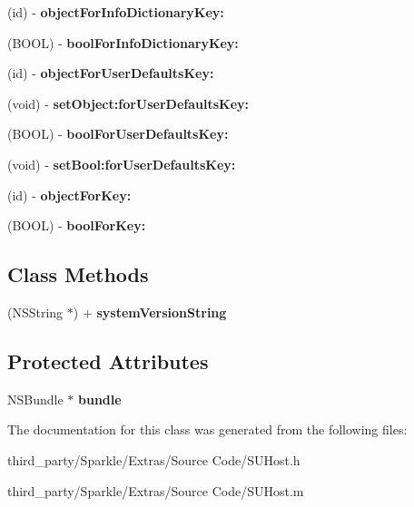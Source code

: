 \begin{DoxyCompactItemize}
\item 
\mbox{\label{interface_s_u_host_a53c40c89670bd0b6a3e36d3dec7887ba}} 
(id) -\/ {\bfseries object\+For\+Info\+Dictionary\+Key\+:}
\item 
\mbox{\label{interface_s_u_host_ad7fb5f7ca4b7ad7b7c2adab81dc8923f}} 
(B\+O\+OL) -\/ {\bfseries bool\+For\+Info\+Dictionary\+Key\+:}
\item 
\mbox{\label{interface_s_u_host_abb9eaf98ce10c54d4fd5c634922e26d5}} 
(id) -\/ {\bfseries object\+For\+User\+Defaults\+Key\+:}
\item 
\mbox{\label{interface_s_u_host_a829e4259ee9031d3bfc410c79e7fd442}} 
(void) -\/ {\bfseries set\+Object\+:for\+User\+Defaults\+Key\+:}
\item 
\mbox{\label{interface_s_u_host_a7417fac7bd6a531fdea052a2d5f0b2ae}} 
(B\+O\+OL) -\/ {\bfseries bool\+For\+User\+Defaults\+Key\+:}
\item 
\mbox{\label{interface_s_u_host_acb12a7c6ec044f93cb967f3323410565}} 
(void) -\/ {\bfseries set\+Bool\+:for\+User\+Defaults\+Key\+:}
\item 
\mbox{\label{interface_s_u_host_ad58ee183294b197ab8c7ac9a0e088ba3}} 
(id) -\/ {\bfseries object\+For\+Key\+:}
\item 
\mbox{\label{interface_s_u_host_acd618e083aa26b8da3e4d83f0da64b2e}} 
(B\+O\+OL) -\/ {\bfseries bool\+For\+Key\+:}
\end{DoxyCompactItemize}
\subsection*{Class Methods}
\begin{DoxyCompactItemize}
\item 
\mbox{\label{interface_s_u_host_a2518edb19901018f1c34727c7baf267c}} 
(N\+S\+String $\ast$) + {\bfseries system\+Version\+String}
\end{DoxyCompactItemize}
\subsection*{Protected Attributes}
\begin{DoxyCompactItemize}
\item 
\mbox{\label{interface_s_u_host_ad8fe07f78ede3432702dccf8d17508ad}} 
N\+S\+Bundle $\ast$ {\bfseries bundle}
\end{DoxyCompactItemize}


The documentation for this class was generated from the following files\+:\begin{DoxyCompactItemize}
\item 
third\+\_\+party/\+Sparkle/\+Extras/\+Source Code/S\+U\+Host.\+h\item 
third\+\_\+party/\+Sparkle/\+Extras/\+Source Code/S\+U\+Host.\+m\end{DoxyCompactItemize}
